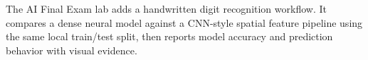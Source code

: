 The AI Final Exam lab adds a handwritten digit recognition workflow. It compares a dense neural model against a CNN-style spatial feature pipeline using the same local train/test split, then reports model accuracy and prediction behavior with visual evidence.
